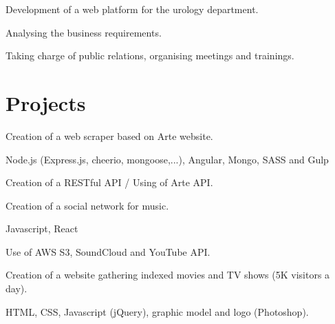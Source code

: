 \documentclass[]{my-resume}
\begin{document}
\begin{minipage}[t]{0.66\textwidth}
Development of a web platform for the urology department.
\begin{tightemize}
\item Analysing the business requirements.
\item Taking charge of public relations, organising meetings and trainings.
\end{tightemize}
\sectionsep


\section{Projects}

Creation of a web scraper based on Arte website.
\begin{tightemize}
\item Node.js (Express.js, cheerio, mongoose,...), Angular, Mongo, SASS and Gulp
\item Creation of a RESTful API / Using of Arte API.
\end{tightemize}
\sectionsep


Creation of a social network for music.
\begin{tightemize}
\item Javascript, React
\item Use of AWS S3, SoundCloud and YouTube API.
\end{tightemize}
\sectionsep


Creation of a website gathering indexed movies and TV shows (5K visitors a day).
\begin{tightemize}
\item HTML, CSS, Javascript (jQuery), graphic model and logo (Photoshop).
\end{tightemize}
\sectionsep

\end{minipage} 
\end{document}
